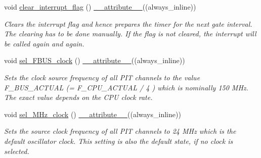 \begin{DoxyCompactItemize}
void \hyperlink{group__Interrupt_gae3f9c981e88cced34153234475de5646}{clear\+\_\+interrupt\+\_\+flag} () \hyperlink{utilities_8hpp_a103d5b3998e0dd804213c8f30a094f4d}{\+\_\+\+\_\+attribute\+\_\+\+\_\+}((always\+\_\+inline))
\begin{DoxyCompactList}\small\item\em Clears the interrupt flag and hence prepares the timer for the next gate interval. The clearing has to be done manually. If the flag is not cleared, the interrupt will be called again and again. \end{DoxyCompactList}\item 
void \hyperlink{group__CLK_ga63e67e2ebfd6ceb5f5e38d9bd6a54754}{sel\+\_\+\+F\+B\+U\+S\+\_\+clock} () \hyperlink{utilities_8hpp_a103d5b3998e0dd804213c8f30a094f4d}{\+\_\+\+\_\+attribute\+\_\+\+\_\+}((always\+\_\+inline))
\begin{DoxyCompactList}\small\item\em Sets the clock source frequency of all P\+IT channels to the value F\+\_\+\+B\+U\+S\+\_\+\+A\+C\+T\+U\+AL (= F\+\_\+\+C\+P\+U\+\_\+\+A\+C\+T\+U\+AL / 4 ) which is nominally 150 M\+Hz. The exact value depends on the C\+PU clock rate. \end{DoxyCompactList}\item 
void \hyperlink{group__CLK_gadb0d04fa23f4ebd20d2f495a86af3ccd}{sel\+\_\+M\+Hz\+\_\+clock} () \hyperlink{utilities_8hpp_a103d5b3998e0dd804213c8f30a094f4d}{\+\_\+\+\_\+attribute\+\_\+\+\_\+}((always\+\_\+inline))
\begin{DoxyCompactList}\small\item\em Sets the source clock frequency of all P\+IT channels to 24 M\+Hz which is the default oscillator clock. This setting is also the default state, if no clock is selected. \end{DoxyCompactList}\end{DoxyCompactItemize}
